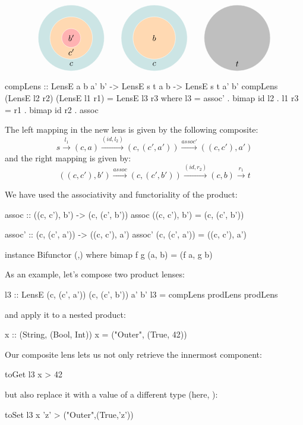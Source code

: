 \documentclass[DaoFP]{subfiles}
\begin{document}
\[
\begin{tikzpicture}
\filldraw[fill=blue!50!green!20, draw=white] (0, 0) circle (1.4);
\filldraw[fill=orange!30, draw=white] (0, 0) circle (0.9);
\filldraw[fill=red!30, draw=white] (0, 0) circle (0.4);
\node at (0, 0) {$b'$};
\node at (0, -0.6) {$c'$};
\node at (0, -1.1) {$c$};
\end{tikzpicture}
\hspace{20pt}
\begin{tikzpicture}
\filldraw[fill=blue!50!green!20, draw=white] (0, 0) circle (1.4);
\filldraw[fill=orange!30, draw=white] (0, 0) circle (0.9);
\node at (0, 0) {$b$};
\node at (0, -1.1) {$c$};
\end{tikzpicture}
\hspace{20pt}
\begin{tikzpicture}
\filldraw[fill=gray!50, draw=white] (0, 0) circle (1.4);
\node at (0, -1.1) {$t$};
\end{tikzpicture}
\]



\begin{haskell}
compLens :: LensE a b a' b' -> LensE s t a b -> LensE s t a' b'
compLens (LensE l2 r2) (LensE l1 r1) = LensE l3 r3
  where l3 = assoc' . bimap id l2  . l1
        r3 = r1 . bimap id r2 . assoc
\end{haskell}
The left mapping in the new lens is given by the following composite:
\[ s \xrightarrow{l_1} (c, a)   \xrightarrow{(id, l_2)} (c, (c', a'))  \xrightarrow{assoc'} ((c, c'), a')\]
and the right mapping is given by:
\[ ((c, c'), b') \xrightarrow{assoc}  (c, (c', b')) \xrightarrow{(id, r_2)} (c, b) \xrightarrow{r_1} t \]

We have used the associativity and functoriality of the product:
\begin{haskell}
assoc :: ((c, c'), b') -> (c, (c', b'))
assoc ((c, c'), b') = (c, (c', b'))

assoc' :: (c, (c', a')) -> ((c, c'), a')
assoc' (c, (c', a')) = ((c, c'), a')

instance Bifunctor (,) where
  bimap f g (a, b) = (f a, g b)
\end{haskell}

As an example, let's compose two product lenses:
\begin{haskell}
l3 :: LensE (c, (c', a')) (c, (c', b')) a' b'
l3 = compLens prodLens prodLens
\end{haskell}
and apply it to a nested product:
\begin{haskell}
x :: (String, (Bool, Int))
x = ("Outer", (True, 42))
\end{haskell}
Our composite lens lets us not only retrieve the innermost component:
\begin{haskell}
toGet l3 x
> 42
\end{haskell}
but also replace it with a value of a different type (here, ):
\begin{haskell}
toSet l3 x 'z'
> ("Outer",(True,'z'))
\end{haskell}
\end{document}
